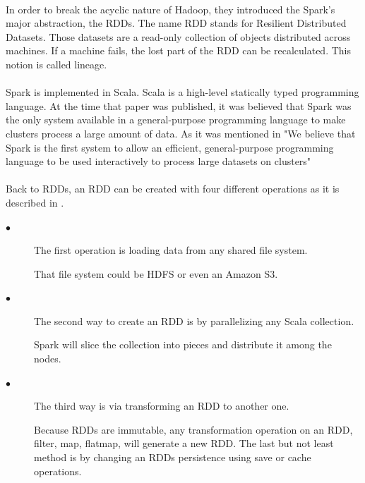 \paragraph{}In order to break the acyclic nature of Hadoop, they introduced the Spark's major abstraction, the RDDs. The name RDD stands for Resilient Distributed Datasets. Those datasets are a read-only collection of objects distributed across machines. If a machine fails, the lost part of the RDD can be recalculated. This notion is called lineage.

\paragraph{}Spark is implemented in Scala. Scala is a high-level statically typed programming language. At the time that paper was published, it was believed that Spark was the only system available in a general-purpose programming language to make clusters process a large amount of data. As it was mentioned in \cite{Zaharia:2010:SCC:1863103.1863113} "We believe that Spark is the first system to allow an efficient, general-purpose programming language to be used interactively to process large datasets on clusters"

\paragraph{}Back to RDDs, an RDD can be created with four different operations as it is described in \cite{Zaharia:2010:SCC:1863103.1863113}.

\begin{description}
	\item[$\bullet$] The first operation is loading data from any shared file system. 
	
	That file system could be HDFS or even an Amazon S3. 
	\item[$\bullet$] The second way to create an RDD is by parallelizing any Scala collection. 
	
	Spark will slice the collection into pieces and distribute it among the nodes.
	\item[$\bullet$] The third way is via transforming an RDD to another one. 
	
	Because RDDs are immutable, any transformation operation on an RDD, filter, map, flatmap, will generate a new RDD. The last but not least method is by changing an RDDs persistence using save or cache operations.
\end{description}


